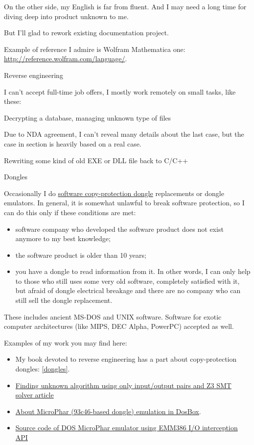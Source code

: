 On the other side, my English is far from fluent.
And I may need a long time for diving deep into product unknown to me.

But I'll glad to rework existing documentation project.

Example of reference I admire is Wolfram Mathematica one: \url{http://reference.wolfram.com/language/}.
\fi

\Large Reverse engineering \normalsize

I can't accept full-time job offers, I mostly work remotely on small tasks, like these:

\large Decrypting a database, managing unknown type of files \normalsize

Due to NDA agreement, I can't reveal many details about the last case, but the case in  section
is heavily based on a real case.

\large Rewriting some kind of old EXE or DLL file back to C/C++ \normalsize

\large Dongles \normalsize

Occasionally I do \href{https://en.wikipedia.org/wiki/Software_protection_dongle}{software copy-protection dongle} replacements or dongle emulators. In general, it is somewhat unlawful to break software protection, so I can do this only if these conditions are met:

\begin{itemize}
\item software company who developed the software product does not exist anymore to my best knowledge;
\item the software product is older than 10 years;
\item you have a dongle to read information from it. In other words, I can only help to those who still uses some very old software, completely satisfied with it, but afraid of dongle electrical breakage and there are no company who can still sell the dongle replacement. 
\end{itemize}

These includes ancient MS-DOS and UNIX software. Software for exotic computer architectures (like MIPS, DEC Alpha, PowerPC) accepted as well.

Examples of my work you may find here:

\begin{itemize}
\item My book devoted to reverse engineering has a part about copy-protection dongles: \ref{dongles}.
\item \href{http://yurichev.com/writings/z3_rockey.pdf}{Finding unknown algorithm using only input/output pairs and Z3 SMT solver article}
\item \href{http://yurichev.com/blog/56/}{About MicroPhar (93c46-based dongle) emulation in DosBox}.
\item \href{http://conus.info/dongle/src/microph.asm}{Source code of DOS MicroPhar emulator using EMM386 I/O interception API}
\end{itemize}

